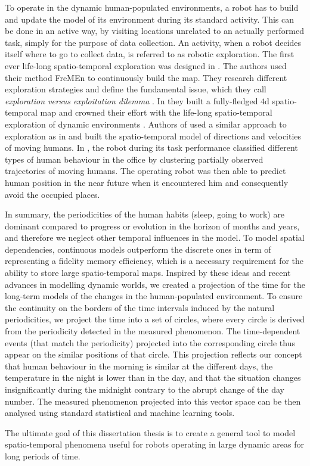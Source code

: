 To operate in the dynamic human-populated environments, a robot has to build and update the model of its environment during its standard activity.
This can be done in an active way, by visiting locations unrelated to an actually performed task, simply for the purpose of data collection.
An activity, when a robot decides itself where to go to collect data, is referred to as robotic exploration.
The first ever life-long spatio-temporal exploration was designed in \cite{Krajnik2015Lifelong}.
The authors used their method FreMEn \cite{krajnik2017fremen} to continuously build the map.
They research different exploration strategies and define the fundamental issue, which they call \textit{exploration versus exploitation dilemma} \cite{kulich2016explore}.
In \cite{santos2016lifelong} they built a fully-fledged $4$d spatio-temporal map and crowned their effort with the life-long spatio-temporal exploration of dynamic environments \cite{santos2017spatio}.
Authors of \cite{Molina2019Go} used a similar approach to exploration as in \cite{Krajnik2015Lifelong} and built the spatio-temporal model of directions and velocities of moving humans.
In \cite{Duckworth2016Unsupervised}, the robot during its task performance classified different types of human behaviour in the office by clustering partially observed trajectories of moving humans.
The operating robot was then able to predict human position in the near future when it encountered him and consequently avoid the occupied places. 



In summary, the periodicities of the human habits (sleep, going to work) are dominant compared to progress or evolution in the horizon of months and years, and therefore we neglect other temporal influences in the model.
To model spatial dependencies, continuous models outperform the discrete ones in term of representing a fidelity memory efficiency, which is a necessary requirement for the ability to store large spatio-temporal maps. 
Inspired by these ideas and recent advances in modelling dynamic worlds, we created a projection of the time for the long-term models of the changes in the human-populated environment.
To ensure the continuity on the borders of the time intervals induced by the natural periodicities, we project the time into a set of circles, where every circle is derived from the periodicity detected in the measured phenomenon.
The time-dependent events (that match the periodicity) projected into the corresponding circle thus appear on the similar positions of that circle.
This projection reflects our concept that human behaviour in the morning is similar at the different days, the temperature in the night is lower than in the day, and that the situation changes insignificantly during the midnight contrary to the abrupt change of the day number.
The measured phenomenon projected into this vector space can be then analysed using standard statistical and machine learning tools.

The ultimate goal of this dissertation thesis is to create a general tool to model spatio-temporal phenomena useful for robots operating in large dynamic areas for long periods of time.
